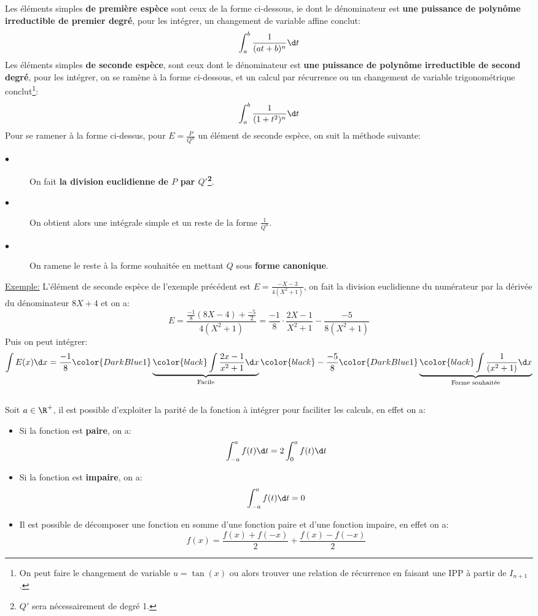 Les éléments simples \textbf{de première espèce} sont ceux de la forme ci-dessous, ie dont le dénominateur est \textbf{une puissance de polynôme irreductible de premier degré}, pour les intégrer, un changement de variable affine conclut:
\[
   \int_{a}^{b} \frac{1}{(at+b)^n}  \d t   
\]
Les éléments simples \textbf{de seconde espèce}, sont ceux dont le dénominateur est \textbf{une puissance de polynôme irreductible de second degré}, pour les intégrer, on se ramène à la forme ci-dessous, et un calcul par récurrence ou un changement de variable trigonométrique conclut\footnote[1]{On peut faire le changement de variable \(u = \tan(x)\) ou alors trouver une relation de récurrence en faisant une IPP à partir de \(I_{n+1}\).}:
\[
   \int_{a}^{b} \frac{1}{(1+t^2)^n}  \d t   
\]
Pour se ramener à la forme ci-dessus, pour \(E = \frac{P}{Q^n}\) un élément de seconde espèce, on suit la méthode suivante:\+
\begin{description}
   \item[$\bullet$] On fait \textbf{la division euclidienne de \(P\) par \(Q'\)\footnote[2]{\(Q'\) sera nécessairement de degré 1.}}.
   \item[$\bullet$] On obtient alors une intégrale simple et un reste de la forme \(\frac{1}{Q^n}\).
   \item[$\bullet$] On ramene le reste à la forme souhaitée en mettant \(Q\) sous \textbf{forme canonique}.
\end{description}
\underline{Exemple:} L'élément de seconde espèce de l'exemple précédent est \(E = \frac{-X - 3}{4(X^2+1)}\), on fait la division euclidienne du numérateur par la dérivée du dénominateur \(8X + 4\) et on a:
\[
   E = \frac{\frac{-1}{8}(8X - 4) + \frac{-5}{2}}{4(X^2+1)} =  \frac{-1}{8} \cdot \frac{2X - 1}{X^2+1} - \frac{-5}{8(X^2 +1)}
\]
Puis on peut intégrer:
\[
   \int E(x) \d x = \frac{-1}{8}  \color{DarkBlue1}\underbrace{\color{black} \int \frac{2x - 1}{x^2+1} \d x}_\text{Facile}\color{black}  - \frac{-5}{8} \color{DarkBlue1}\underbrace{\color{black}\int \frac{1}{(x^2 +1)} \d x}_\text{Forme souhaitée}
\]

\subsection*{}

Soit \(a \in \R^+\), il est possible d'exploiter la parité de la fonction à intégrer pour faciliter les calculs, en effet on a:
\begin{itemize}
   \item Si la fonction est \textbf{paire}, on a:
   \[
      \int_{-a}^{a} f(t) \d t = 2\int_{0}^{a} f(t) \d t
   \]
   \item Si la fonction est \textbf{impaire}, on a:
   \[
      \int_{-a}^{a} f(t) \d t = 0
   \]
   \item Il est possible de décomposer une fonction en somme d'une fonction paire et d'une fonction impaire, en effet on a:
   \[
      f(x) = \frac{f(x) + f(-x)}{2} + \frac{f(x) - f(-x)}{2}   
   \]
\end{itemize}